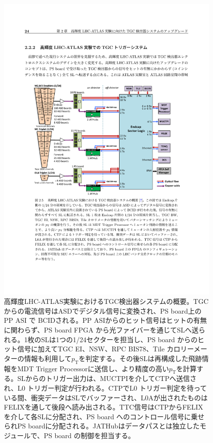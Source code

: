 \begin{figure} 
\centering
\includegraphics[width=16cm]{fig/Intro/TGC_phase2tdaq.pdf}
\caption[高輝度LHC-ATLAS実験におけるTGC検出器システムの概要]{高輝度LHC-ATLAS実験におけるTGC検出器システムの概要\cite{tdr_phase2muon_2017017}。TGCからの電流信号はASDでデジタル信号に変換され、PS board上のPP ASI で BCIDされる。PP ASIからのヒット信号はヒットの有無に関わらず、PS board FPGA から光ファイバーを通じてSLへ送られる。1枚のSLは1つの1/24セクターを担当し、PS board からのヒット信号に加えてTGC EI、NSW、RPC BIS78、Tile カロリーメーターの情報も利用して$p_{\mathrm{T}}$を判定する。その後SLは再構成した飛跡情報をMDT Trigger Processorに送信し、より精度の高い$p_{\mathrm{T}}$を計算する。SLからのトリガー出力は、MUCTPIを介してCTPへ送信され、L0 トリガー判定が行われる。CTPでL0 トリガー判定を待っている間、衝突データはSLでバッファーされ、L0Aが出されたものはFELIXを通して後段へ読み出される。TTC信号はCTPからFELIXを介して各SLに分配され、PS board へのコントロール信号に乗せられPS boardに分配される。JATHubはデータパスとは独立したモジュールで、PS board の制御を担当する。}
\label{TGC_phase2tdaq}
\end{figure}

